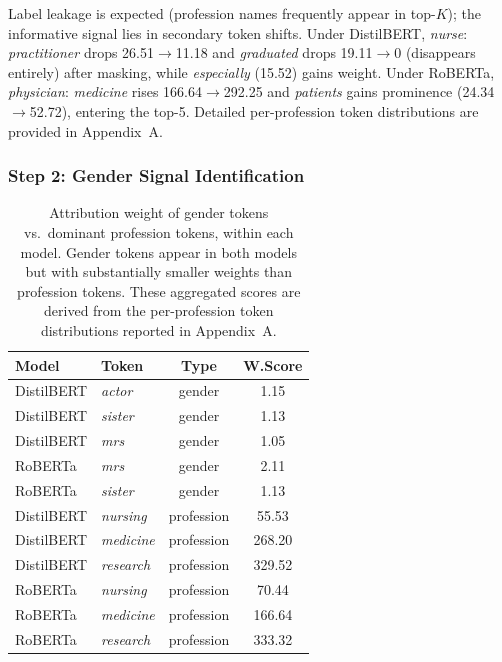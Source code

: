 \documentclass[11pt]{article}
\begin{document}
Label leakage is expected (profession names frequently appear in top-$K$);
the informative signal lies in secondary token shifts.
Under DistilBERT, \emph{nurse}: \emph{practitioner} drops 26.51$\to$11.18
and \emph{graduated} drops 19.11$\to$0 (disappears entirely) after masking, while
\emph{especially} (15.52) gains weight.
Under RoBERTa, \emph{physician}: \emph{medicine} rises 166.64$\to$292.25
and \emph{patients} gains prominence (24.34$\to$52.72), entering the top-5.
Detailed per-profession token distributions are provided in Appendix~A.

\subsubsection*{Step 2: Gender Signal Identification}
\label{sec:gender_signal}

\begin{table}[h]
\centering\small
\setlength{\tabcolsep}{4pt}
\begin{tabular}{llcc}
\toprule
\textbf{Model} & \textbf{Token} & \textbf{Type} & \textbf{W.Score} \\
\midrule
DistilBERT & \emph{actor}  & gender & 1.15 \\
DistilBERT & \emph{sister} & gender & 1.13 \\
DistilBERT & \emph{mrs}    & gender & 1.05 \\
\midrule
RoBERTa & \emph{mrs}    & gender & 2.11 \\
RoBERTa & \emph{sister} & gender & 1.13 \\
\midrule
DistilBERT & \emph{nursing}  & profession & 55.53 \\
DistilBERT & \emph{medicine} & profession & 268.20 \\
DistilBERT & \emph{research} & profession & 329.52 \\
\midrule
RoBERTa & \emph{nursing}  & profession & 70.44 \\
RoBERTa & \emph{medicine} & profession & 166.64 \\
RoBERTa & \emph{research} & profession & 333.32 \\
\bottomrule
\end{tabular}
\caption{Attribution weight of gender tokens vs.\ dominant profession tokens,
within each model. Gender tokens appear in both models but with substantially
smaller weights than profession tokens.
These aggregated scores are derived from the per-profession token distributions reported in Appendix~A.}
\label{tab:gender_tokens}
\end{table}
\end{document}
